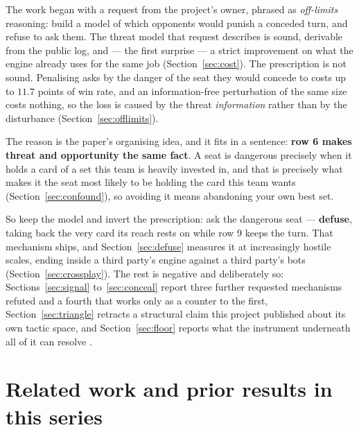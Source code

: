\documentclass[11pt]{article}
\begin{document}
The work began with a request from the project's owner, phrased as \emph{off-limits} reasoning:
build a model of which opponents would punish a conceded turn, and refuse to ask them. The threat
model that request describes is sound, derivable from the public log, and --- the first surprise ---
a strict improvement on what the engine already uses for the same job (Section~\ref{sec:cost}). The
prescription is not sound. Penalising asks by the danger of the seat they would concede to costs up
to $11.7$ points of win rate, and an information-free perturbation of the same size costs nothing,
so the loss is caused by the threat \emph{information} rather than by the disturbance
(Section~\ref{sec:offlimits}).

The reason is the paper's organising idea, and it fits in a sentence: \textbf{row 6 makes threat and
opportunity the same fact}. A seat is dangerous precisely when it holds a card of a set this team is
heavily invested in, and that is precisely what makes it the seat most likely to be holding the card
this team wants (Section~\ref{sec:confound}), so avoiding it means abandoning your own best set.

So keep the model and invert the prescription: ask the dangerous seat --- \textbf{defuse}, taking
back the very card its reach rests on while row 9 keeps the turn. That mechanism ships, and
Section~\ref{sec:defuse} measures it at increasingly hostile scales, ending inside a third party's
engine against a third party's bots (Section~\ref{sec:crossplay}). The rest is negative and
deliberately so: Sections~\ref{sec:signal} to~\ref{sec:conceal} report three further requested
mechanisms refuted and a fourth that works only as a counter to the first,
Section~\ref{sec:triangle} retracts a structural claim this project published about its own tactic
space, and Section~\ref{sec:floor} reports what the instrument underneath all of it can resolve
\cite{floorpaper}.

\section{Related work and prior results in this series}
\label{sec:related}
\end{document}
